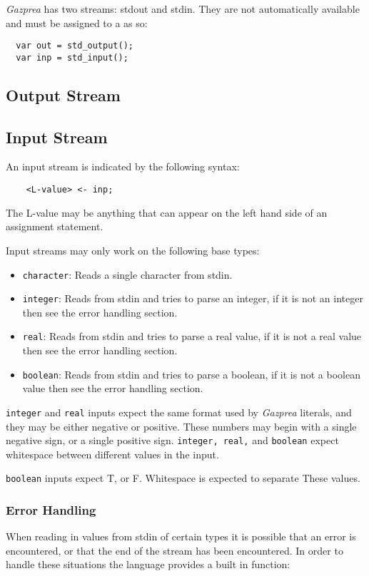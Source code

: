 \documentclass[../../gazprea.tex]{subfiles}
\begin{document}
\textit{Gazprea} has two streams: stdout and stdin. They are not automatically available and must be
assigned to a  as so:
\begin{lstlisting}
  var out = std_output();
  var inp = std_input();
\end{lstlisting}

\subsection{Output Stream}
\label{ssec:output}


\subsection{Input Stream}
An input stream is indicated by the following syntax:

\begin{lstlisting}
	<L-value> <- inp;
\end{lstlisting}

The L-value may be anything that can appear on the left hand side of an assignment statement.

Input streams may only work on the following base types:
\begin{itemize}
	\item \texttt{character}: Reads a single character from stdin.
	\item \texttt{integer}: Reads from stdin and tries to parse an integer, if it is not an integer then see the
	error handling section.
	\item \texttt{real}: Reads from stdin and tries to parse a real value, if it is not a real value then see
	the error handling section.
	\item \texttt{boolean}: Reads from stdin and tries to parse a boolean, if it is
	not a boolean value then see the error handling section.
\end{itemize}

\texttt{integer} and \texttt{real} inputs expect the same format used by \textit{Gazprea} literals, and they may
be either negative or positive. These numbers may begin with a single negative sign, or a single positive sign.
\texttt{integer, real,} and \texttt{boolean} expect whitespace between different values in the input.

\texttt{boolean} inputs expect T, or F. Whitespace is expected to separate These values.


\subsubsection{Error Handling}
When reading in values from stdin of certain types it is possible that an error is encountered, or that the end
of the stream has been encountered. In order to handle these situations the language provides a built in
function:
\end{document}
